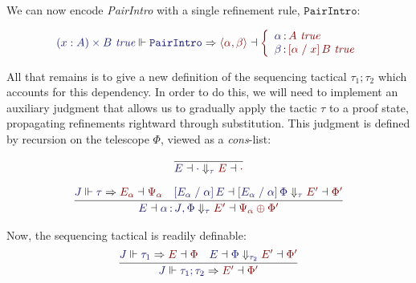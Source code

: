 \documentclass[11pt]{article}
\theoremstyle{definition}
\theoremstyle{remark}
\numberwithin{equation}{section}
\def\InputModeColorName{MidnightBlue}
\def\OutputModeColorName{Maroon}
\newcommand\InputMode[1]{{\color{\InputModeColorName}{#1}}}
\newcommand\OutputMode[1]{{\color{\OutputModeColorName}{#1}}}
\newcommand\JJ{J}
\newcommand\Tuple[1]{\left\langle#1\right\rangle}
\newcommand\ISG[2]{\InputMode{#1}\,{\color{Black}:}\,\InputMode{#2}}
\newcommand\OSG[2]{\InputMode{#1}\,{\color{Black}:}\,\OutputMode{#2}}
\newcommand\Refine[4]{\InputMode{#1}\Vdash\InputMode{#2}\Rightarrow\OutputMode{#4}\dashv\OutputMode{#3}}
\newcommand\ThenStateTrans[5]{%
  \InputMode{#2}\dashv\InputMode{#3}%
  \Downarrow_\InputMode{#1}%
  \OutputMode{#4}\dashv\OutputMode{#5}%
}
\newcommand\IsTrueUnmoded[1]{#1\ \textit{true}}
\newcommand\ThenTac[2]{#1;#2}
\newcommand\DProdIntroRuleNullary{\mathtt{PairIntro}}
\newcommand\TyDProd[3]{(#2:#1) \times #3}
\newcommand\Subst[3]{\left[#1\;/\;#2\right]#3}
\begin{document}
We can now encode \emph{PairIntro} with a single refinement rule,
$\DProdIntroRuleNullary$:

\[
  \Refine{\IsTrueUnmoded{\TyDProd{A}{x}{B}}}{\DProdIntroRuleNullary}{%
    \left\{\begin{array}{l}
        \OSG{\alpha}{\IsTrueUnmoded{A}}\\
        \OSG{\beta}{\IsTrueUnmoded{\Subst{\alpha}{x}{B}}}
    \end{array}\right.
  }{
    \Tuple{\alpha,\beta}
  }
\]

All that remains is to give a new definition of the sequencing tactical
$\ThenTac{\tau_1}{\tau_2}$ which accounts for this dependency. In order to do
this, we will need to implement an auxiliary judgment
\framebox{$\ThenStateTrans{\tau}{E}{\Phi}{E'}{\Phi'}$} that allows us to
gradually apply the tactic $\tau$ to a proof state, propagating refinements
rightward through substitution. This judgment is defined by recursion on the
telescope $\Phi$, viewed as a \emph{cons}-list:

\begin{gather*}
  \infer{
    \ThenStateTrans{\tau}{E}{\cdot}{E}{\cdot}
  }{
  }\\[6pt]
  \infer{
    \ThenStateTrans{\tau}{E}{\ISG{\alpha}{\JJ},\Phi}{E'}{\Psi_\alpha\oplus\Phi'}
  }{
    \Refine{\JJ}{\tau}{\Psi_\alpha}{E_\alpha} &
    \ThenStateTrans{\tau}{%
      \Subst{E_\alpha}{\alpha}{E}%
    }{
      \Subst{E_\alpha}{\alpha}{\Phi}
    }{E'}{\Phi'}
  }
\end{gather*}

Now, the sequencing tactical is readily definable:
\[
  \infer{
    \Refine{\JJ}{\ThenTac{\tau_1}{\tau_2}}{\Phi'}{E'}
  }{
    \Refine{\JJ}{\tau_1}{\Phi}{E} &
    \ThenStateTrans{\tau_2}{E}{\Phi}{E'}{\Phi'}
  }
\]
\end{document}
